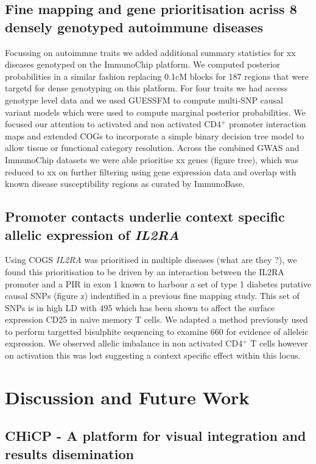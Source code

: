 \documentclass[a4paper,11pt]{book}
\begin{document}
\section{Fine mapping and gene prioritisation acriss 8 densely genotyped autoimmune diseases}
Focussing on autoimmne traits we added additional summary statistics for xx diseases genotyped on the ImmunoChip platform. We computed posterior probabilities in a similar fashion replacing 0.1cM blocks for 187 regions that were targetd for dense genotyping on this platform. For four traits we had access genotype level data and we used GUESSFM to compute multi-SNP causal variant models which were used to compute marginal posterior probabilities. We focused our attention to activated and non activated CD4$^{+}$ promoter interaction maps and extended COGs to incorporate a simple binary decision tree model to allow tissue or functional category resolution.  Across the combined GWAS and ImmunoChip datasets we were able prioritise xx genes (figure tree), which was reduced to xx on further filtering using gene expression data and overlap with known disease susceptibility regions as curated by ImmunoBase.

\section{Promoter contacts underlie context specific allelic expression of \textit{IL2RA}}
Using COGS \textit{IL2RA} was prioritised in multiple diseases (what are they ?), we found this prioritisation to be driven by an interaction between the IL2RA promoter and a PIR in exon 1 known to harbour a set of type 1 diabetes putative causal SNPs (figure z) indentified in a previous fine mapping study\cite{WallaceCutlerPontikosEtAl2015}. This set of SNPs is in high LD with 495 which has been shown to affect the surface expression CD25 in naive memory T cells\cite{DendrouPlagnolFungEtAl2009}. We adapted a method previously used to perform targetted bisulphite sequencing to examine 660 for evidence of alleleic expression. We observed allelic imbalance  in non activated CD4$^{+}$ T cells however on activation this was lost suggesting a context specific effect within this locus.

\chapter{Discussion and Future Work}
\section{CHiCP - A platform for visual integration and results disemination}
\end{document}

